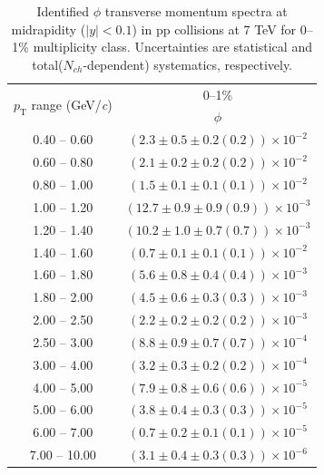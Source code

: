 \begin{table}
\caption{Identified $\phi$ transverse momentum spectra at midrapidity ($|y|<0.1$) in pp collisions at 7 TeV for 0--1\% multiplicity class. Uncertainties are statistical and total($N_{ch}$-dependent) systematics, respectively.}
\label{tab:Phi_0to1}
\begin{center}
\begin{tabular}{ c | c }
\hline
\multirow{2}{*}{$p_{\mathrm{T}}$ range (GeV/\textit{c})} & \multicolumn{1}{c}{0--1\%} \\ & $\phi$\\ 
\hline
0.40 -- 0.60 & $(2.3\pm0.5\pm0.2(0.2))\times10^{-2}$ \\ 
0.60 -- 0.80 & $(2.1\pm0.2\pm0.2(0.2))\times10^{-2}$ \\ 
0.80 -- 1.00 & $(1.5\pm0.1\pm0.1(0.1))\times10^{-2}$ \\ 
1.00 -- 1.20 & $(12.7\pm0.9\pm0.9(0.9))\times10^{-3}$ \\ 
1.20 -- 1.40 & $(10.2\pm1.0\pm0.7(0.7))\times10^{-3}$ \\ 
1.40 -- 1.60 & $(0.7\pm0.1\pm0.1(0.1))\times10^{-2}$ \\ 
1.60 -- 1.80 & $(5.6\pm0.8\pm0.4(0.4))\times10^{-3}$ \\ 
1.80 -- 2.00 & $(4.5\pm0.6\pm0.3(0.3))\times10^{-3}$ \\ 
2.00 -- 2.50 & $(2.2\pm0.2\pm0.2(0.2))\times10^{-3}$ \\ 
2.50 -- 3.00 & $(8.8\pm0.9\pm0.7(0.7))\times10^{-4}$ \\ 
3.00 -- 4.00 & $(3.2\pm0.3\pm0.2(0.2))\times10^{-4}$ \\ 
4.00 -- 5.00 & $(7.9\pm0.8\pm0.6(0.6))\times10^{-5}$ \\ 
5.00 -- 6.00 & $(3.8\pm0.4\pm0.3(0.3))\times10^{-5}$ \\ 
6.00 -- 7.00 & $(0.7\pm0.2\pm0.1(0.1))\times10^{-5}$ \\ 
7.00 -- 10.00 & $(3.1\pm0.4\pm0.3(0.3))\times10^{-6}$ \\ 
\hline
\end{tabular}
\end{center}
\end{table}
 
